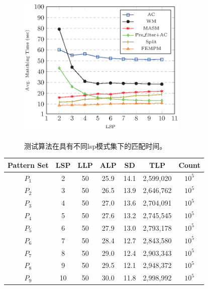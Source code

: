 \begin{figure}[H]
  \centering
  \includegraphics[height=3in, width=3.2in]{figures/2_MPM/lsp}
  \caption{测试算法在具有不同lsp模式集下的匹配时间。}
  \label{fig:lsp}
\end{figure}


\begin{table}
  \centering
  \label{tab:lsps}
  \begin{tabular}{ccccccc}
    \hline
    Pattern Set & LSP  & LLP  & ALP & SD & TLP & Count\\
    \hline
    $P_1$ & 2 & 50 & 25.9 & 14.1 & 2,599,020 & $10^5$\\
    $P_2$ & 3 & 50 & 26.5 & 13.9 & 2,646,762 & $10^5$\\
    $P_3$ & 4 & 50 & 27.0 & 13.6 & 2,704,091 & $10^5$\\
    $P_4$ & 5 & 50 & 27.6 & 13.2 & 2,745,545 & $10^5$\\
    $P_5$ & 6 & 50 & 27.9 & 13.0 & 2,793,178 & $10^5$\\
    $P_6$ & 7 & 50 & 28.4 & 12.7 & 2,843,580 & $10^5$\\
    $P_7$ & 8 & 50 & 29.0 & 12.4 & 2,903,343 & $10^5$\\
    $P_8$ & 9 & 50 & 29.5 & 12.1 & 2,948,372 & $10^5$\\
    $P_9$ &10 & 50 & 30.0 & 11.8 & 2,998,992 & $10^5$\\
    \hline
  \end{tabular}
\end{table}


